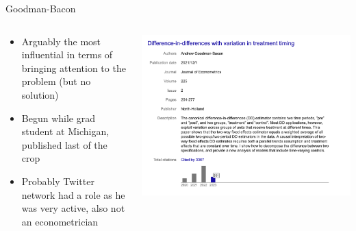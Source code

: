 \documentclass{beamer}
\begin{document}
\begin{frame}{Goodman-Bacon}
  \begin{columns}
    \begin{column}{0.5\textwidth}
      \begin{itemize}
\item Arguably the most influential in terms of bringing attention to the problem (but no solution)
\item Begun while grad student at Michigan, published last of the crop
\item Probably Twitter network had a role as he was very active, also not an econometrician
      \end{itemize}
    \end{column}
    \begin{column}{0.5\textwidth}
      \includegraphics[scale=0.25]{./lecture_includes/andrew_cites}
    \end{column}
  \end{columns}
\end{frame}
\end{document}
